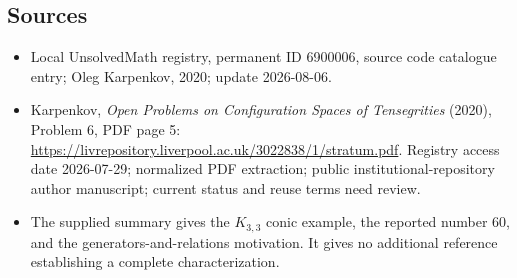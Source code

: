 \documentclass[11pt]{article}
\begin{document}
\subsection{Sources}
\begin{itemize}
\item Local UnsolvedMath registry, permanent ID 6900006, source code catalogue entry; Oleg Karpenkov, 2020; update 2026-08-06.
\item Karpenkov, \emph{Open Problems on Configuration Spaces of Tensegrities} (2020), Problem 6, PDF page 5: \url{https://livrepository.liverpool.ac.uk/3022838/1/stratum.pdf}. Registry access date 2026-07-29; normalized PDF extraction; public institutional-repository author manuscript; current status and reuse terms need review.
\item The supplied summary gives the \(K_{3,3}\) conic example, the reported number 60, and the generators-and-relations motivation. It gives no additional reference establishing a complete characterization.
\end{itemize}
\end{document}
